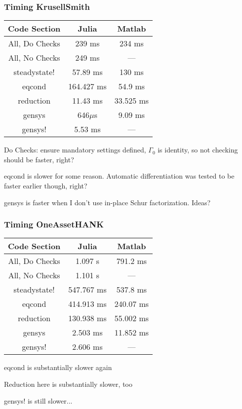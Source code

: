 \documentclass{beamer}
\begin{document}
\begin{frame}
  \frametitle{Timing KrusellSmith}
  \begin{center}
    \begin{tabular}{|c|c|c|}
      \hline
      Code Section & Julia & Matlab\\
      \hline
      All, Do Checks & 239 ms & 234 ms\\
      All, No Checks & 249 ms & ---\\
      steadystate! & 57.89 ms & 130 ms\\
      eqcond & 164.427 ms & 54.9 ms\\
      reduction & 11.43 ms & 33.525 ms\\
      gensys & 646$\mu$s & 9.09 ms\\
      gensys! & 5.53 ms & ---\\
      \hline
    \end{tabular}
\item Do Checks: ensure mandatory settings defined, $\Gamma_0$ is identity, so not checking should be faster, right?
\item eqcond is slower for some reason. Automatic differentiation was tested to be faster earlier though, right?
\item gensys is faster when I don't use in-place Schur factorization. Ideas?
  \end{center}
\end{frame}
\begin{frame}
  \frametitle{Timing OneAssetHANK}
  \begin{center}
    \begin{tabular}{|c|c|c|}
      \hline
      Code Section & Julia & Matlab\\
      \hline
      All, Do Checks & 1.097 s & 791.2 ms\\
      All, No Checks & 1.101 s & ---\\
      steadystate! & 547.767 ms & 537.8 ms\\
      eqcond & 414.913  ms & 240.07 ms\\
      reduction & 130.938 ms & 55.002 ms\\
      gensys & 2.503 ms & 11.852 ms\\
      gensys! & 2.606 ms & ---\\
      \hline
    \end{tabular}
\item eqcond is substantially slower again
\item Reduction here is substantially slower, too
\item gensys! is still slower...
  \end{center}
\end{frame}
\end{document}
